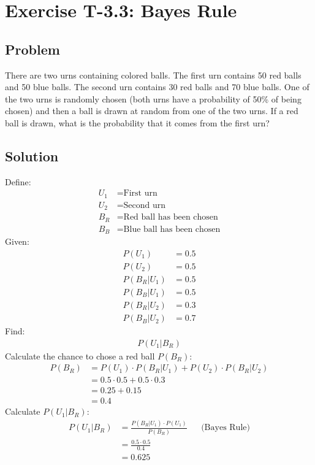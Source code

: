 \section*{Exercise T-3.3: Bayes Rule}

\subsection*{Problem}
There are two urns containing colored balls. The first urn contains 50 red balls and 50 blue balls. The second urn contains 30 red balls and 70 blue balls. One of the two urns is randomly chosen (both urns have a probability of 50\% of being chosen) and then a ball is drawn at random from one of the two urns. If a red ball is drawn, what is the probability that it comes from the first urn?


\subsection*{Solution}
Define:
\begin{align}
	U_1 &= \text{First urn}\nonumber \\
	U_2 &= \text{Second urn}\nonumber \\
	B_R &= \text{Red ball has been chosen}\nonumber \\
	B_B &= \text{Blue ball has been chosen}\nonumber
\end{align}
Given:
\begin{align}
	P(U_1) &= 0.5 \nonumber \\
	P(U_2) &= 0.5 \nonumber \\
	P(B_R|U_1) &= 0.5 \nonumber \\
	P(B_B|U_1) &= 0.5 \nonumber \\
	P(B_R|U_2) &= 0.3 \nonumber \\
	P(B_B|U_2) &= 0.7 \nonumber
\end{align}
Find:
\begin{align}
P(U_1|B_R) \nonumber
\end{align}
Calculate the chance to chose a red ball $P(B_R)$:
\begin{align}
	P(B_R) &= P(U_1) \cdot P(B_R|U_1) + P(U_2) \cdot P(B_R|U_2)\nonumber\\
	&= 0.5 \cdot 0.5 + 0.5 \cdot 0.3 \nonumber \\
	&= 0.25 + 0.15 \nonumber \\
	&= 0.4 \nonumber 
\end{align}
Calculate $P(U_1|B_R)$:
\begin{align}
P(U_1|B_R) &= \frac{P(B_R|U_1) \cdot  P(U_1)}{P(B_R)} && \text{(Bayes Rule)} \nonumber \\
&= \frac{0.5 \cdot 0.5}{0.4} \nonumber \\
&= 0.625 \nonumber
\end{align}










